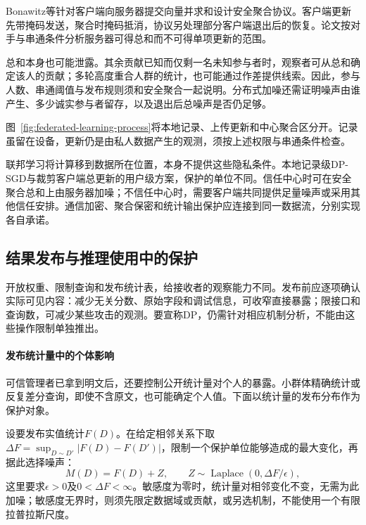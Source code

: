 Bonawitz等针对客户端向服务器提交向量并求和设计安全聚合协议。客户端更新先带掩码发送，聚合时掩码抵消，协议另处理部分客户端退出后的恢复。论文按对手与串通条件分析服务器可得总和而不可得单项更新的范围。

总和本身也可能泄露。其余贡献已知而仅剩一名未知参与者时，观察者可从总和确定该人的贡献；多轮高度重合人群的统计，也可能通过作差提供线索。因此，参与人数、串通阈值与发布规则须和安全聚合一起说明。分布式加噪还需证明噪声由谁产生、多少诚实参与者留存，以及退出后总噪声是否仍足够。

图~\ref{fig:federated-learning-process}将本地记录、上传更新和中心聚合区分开。记录虽留在设备，更新仍是由私人数据产生的观测，须按上述权限与串通条件检查。

联邦学习将计算移到数据所在位置，本身不提供这些隐私条件。本地记录级DP-SGD与裁剪客户端总更新的用户级方案，保护的单位不同。信任中心时可在安全聚合总和上由服务器加噪；不信任中心时，需要客户端共同提供足量噪声或采用其他信任安排。通信加密、聚合保密和统计输出保护应连接到同一数据流，分别实现各自承诺。

\subsection{结果发布与推理使用中的保护}
\label{sec:privacy-statistical-release}

开放权重、限制查询和发布统计表，给接收者的观察能力不同。发布前应逐项确认实际可见内容：减少无关分数、原始字段和调试信息，可收窄直接暴露；限接口和查询数，可减少某些攻击的观测。要宣称DP，仍需针对相应机制分析，不能由这些操作限制单独推出。

\paragraph{发布统计量中的个体影响}

可信管理者已拿到明文后，还要控制公开统计量对个人的暴露。小群体精确统计或反复差分查询，即使不含原文，也可能确定个人值。下面以统计量的发布分布作为保护对象。

设要发布实值统计$F(D)$。在给定相邻关系下取$\Delta F=\sup_{D\sim D'}|F(D)-F(D')|$，限制一个保护单位能够造成的最大变化，再据此选择噪声：
\begin{equation}
 M(D)=F(D)+Z,\qquad
 Z\sim\operatorname{Laplace}(0,\Delta F/\epsilon),
 \label{eq:privacy-laplace}
\end{equation}
这里要求$\epsilon>0$及$0<\Delta F<\infty$。敏感度为零时，统计量对相邻变化不变，无需为此加噪；敏感度无界时，则须先限定数据域或贡献，或另选机制，不能使用一个有限拉普拉斯尺度。

